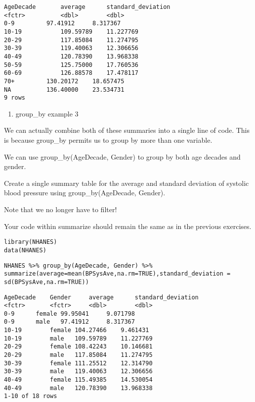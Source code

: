 \documentclass[]{article}
\providecommand{\tightlist}{%
  \setlength{\itemsep}{0pt}\setlength{\parskip}{0pt}}
\begin{document}
\begin{verbatim}
AgeDecade       average      standard_deviation
<fctr>          <dbl>        <dbl>
0-9         97.41912     8.317367
10-19           109.59789    11.227769
20-29           117.85084    11.274795
30-39           119.40063    12.306656
40-49           120.78390    13.968338
50-59           125.75000    17.760536
60-69           126.88578    17.478117
70+         130.20172    18.657475
NA          136.40000    23.534731
9 rows
\end{verbatim}

\begin{enumerate}
\def\labelenumi{\arabic{enumi}.}
\setcounter{enumi}{6}
\tightlist
\item
  group\_by example 3
\end{enumerate}

We can actually combine both of these summaries into a single line of
code. This is because group\_by permits us to group by more than one
variable.

We can use group\_by(AgeDecade, Gender) to group by both age decades and
gender.

Create a single summary table for the average and standard deviation of
systolic blood pressure using group\_by(AgeDecade, Gender).

Note that we no longer have to filter!

Your code within summarize should remain the same as in the previous
exercises.

\begin{verbatim}
library(NHANES)
data(NHANES)
\end{verbatim}

\begin{verbatim}
NHANES %>% group_by(AgeDecade, Gender) %>% summarize(average=mean(BPSysAve,na.rm=TRUE),standard_deviation = sd(BPSysAve,na.rm=TRUE))
\end{verbatim}

\begin{verbatim}
AgeDecade    Gender     average      standard_deviation
<fctr>       <fctr>     <dbl>        <dbl>
0-9      female 99.95041     9.071798
0-9      male   97.41912     8.317367
10-19        female 104.27466    9.461431
10-19        male   109.59789    11.227769
20-29        female 108.42243    10.146681
20-29        male   117.85084    11.274795
30-39        female 111.25512    12.314790
30-39        male   119.40063    12.306656
40-49        female 115.49385    14.530054
40-49        male   120.78390    13.968338
1-10 of 18 rows
\end{verbatim}
\end{document}
